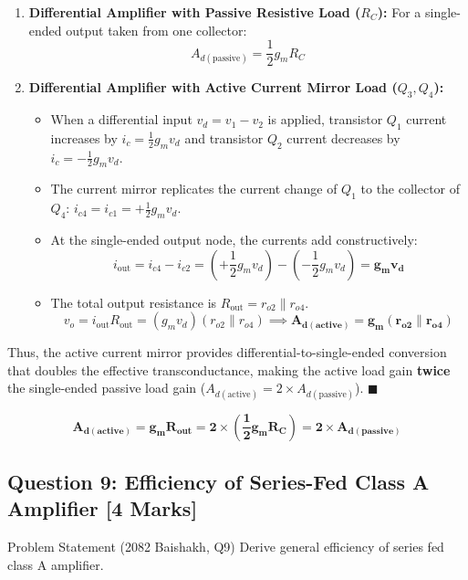 \documentclass[11pt,a4paper,oneside]{book}
\begin{document}
\begin{enumerate}[leftmargin=1.5em]
  \item \textbf{Differential Amplifier with Passive Resistive Load ($R_C$):}
  For a single-ended output taken from one collector:
  \[
  A_{d(\text{passive})} = \frac{1}{2} g_m R_C
  \]
  \item \textbf{Differential Amplifier with Active Current Mirror Load ($Q_3, Q_4$):}
  \begin{itemize}[leftmargin=1.5em]
    \item When a differential input $v_d = v_1 - v_2$ is applied, transistor $Q_1$ current increases by $i_c = \frac{1}{2} g_m v_d$ and transistor $Q_2$ current decreases by $i_c = -\frac{1}{2} g_m v_d$.
    \item The current mirror replicates the current change of $Q_1$ to the collector of $Q_4$: $i_{c4} = i_{c1} = +\frac{1}{2} g_m v_d$.
    \item At the single-ended output node, the currents add constructively:
    \[
    i_{\text{out}} = i_{c4} - i_{c2} = \left(+\frac{1}{2} g_m v_d\right) - \left(-\frac{1}{2} g_m v_d\right) = \mathbf{g_m v_d}
    \]
    \item The total output resistance is $R_{\text{out}} = r_{o2} \parallel r_{o4}$.
    \[
    v_o = i_{\text{out}} R_{\text{out}} = (g_m v_d)(r_{o2} \parallel r_{o4}) \implies \mathbf{A_{d(\text{active})} = g_m (r_{o2} \parallel r_{o4})}
    \]
  \end{itemize}
\end{enumerate}
Thus, the active current mirror provides differential-to-single-ended conversion that doubles the effective transconductance, making the active load gain \textbf{twice} the single-ended passive load gain ($A_{d(\text{active})} = 2 \times A_{d(\text{passive})}$). $\blacksquare$

\begin{answerbox}
$$\mathbf{A_{d(\text{active})} = g_m R_{\text{out}} = 2 \times \left(\frac{1}{2} g_m R_C\right) = 2 \times A_{d(\text{passive})}}$$
\end{answerbox}

\vspace{0.6cm}

\subsection{Question 9: Efficiency of Series-Fed Class A Amplifier [4 Marks]}
\begin{questionbox}{Problem Statement (2082 Baishakh, Q9)}
Derive general efficiency of series fed class A amplifier.
\end{questionbox}
\end{document}
